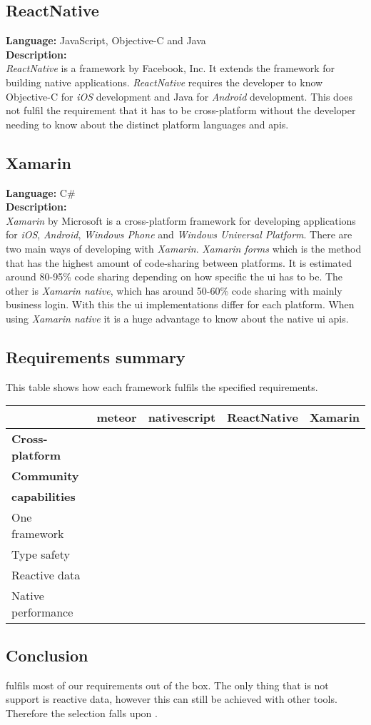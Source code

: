 \subsection*{ReactNative}
\textbf{Language:} JavaScript, Objective-C and Java
\\
\textbf{Description:}
\\
\textit{ReactNative} is a framework by Facebook, Inc.
It extends the  framework for building native applications.
\textit{ReactNative} requires the developer to know Objective-C for \textit{iOS} development and Java for \textit{Android} development.
This does not fulfil the requirement that it has to be cross-platform without the developer needing to know about the distinct platform languages and \glspl{api}.


\subsection*{Xamarin}
\textbf{Language:} C\#
\\
\textbf{Description:}
\\
\textit{Xamarin} by Microsoft is a cross-platform framework for developing applications for \textit{iOS}, \textit{Android}, \textit{Windows Phone} and \textit{Windows Universal Platform}.
There are two main ways of developing with \textit{Xamarin}.
\textit{Xamarin forms} which is the method that has the highest amount of code-sharing between platforms.
It is estimated around 80-95\% code sharing depending on how specific the \gls{ui} has to be.
The other is \textit{Xamarin native}, which has around 50-60\% code sharing with mainly business login.
With this the \gls{ui} implementations differ for each platform.
When using \textit{Xamarin native} it is a huge advantage to know about the native \gls{ui} \glspl{api}.

\subsection*{Requirements summary}
This table shows how each framework fulfils the specified requirements.

\begin{tabularx}{\textwidth}{|l|C C C C|}
	\hline
	& \gls{meteor} & \gls{nativescript} & ReactNative & Xamarin \\
	\hline
	\textbf{Cross-platform} & \cmark & \cmark & \cmark & \cmark \\
	\hline
	\textbf{Community} & \cmark & \cmark & \cmark & \cmark \\
	\hline
	\textbf{ capabilities} & \cmark & \cmark & \cmark & \cmark \\
	\hline
	One framework & \cmark & \cmark & \xmark & \xmark \\
	\hline
	Type safety & \xmark & \cmark & \xmark & \cmark \\
	\hline
	Reactive data & \cmark & \xmark & \xmark & \xmark \\
	\hline
	Native performance & \xmark & \cmark & \cmark & \cmark \\
	\hline
\end{tabularx}

\subsection*{Conclusion}
 fulfils most of our requirements out of the box.
The only thing that is not support is reactive data, however this can still be achieved with other tools.
Therefore the selection falls upon .
